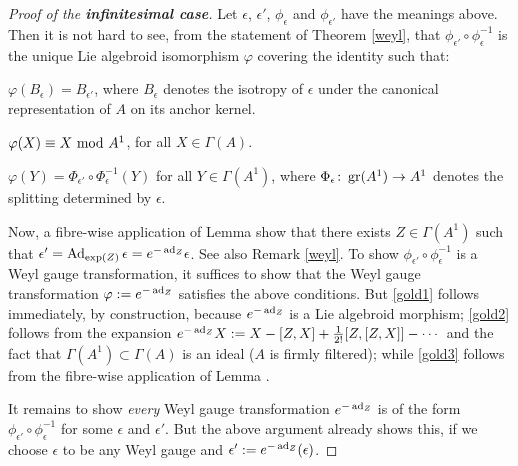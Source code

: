 \documentclass[leqno,12pt]{amsart} %
\begin{document}
\begin{proof}[Proof of the {\bfseries infinitesimal case}]
  Let $\epsilon $, $\epsilon'$, $\phi_\epsilon $ and $\phi_{\epsilon'}$ have the meanings
  above. Then it is not hard to see, from the statement of Theorem \ref{weyl}, that
  $\phi_{\epsilon'}\circ \phi_\epsilon^{-1} $ is the unique Lie algebroid isomorphism
  $\varphi$ covering the identity such that:
  \begin{conditions}
  \item \label{gold1} $\varphi(B_\epsilon) = B_{\epsilon'}$, where $B_\epsilon$ denotes
    the isotropy of $\epsilon $ under the canonical representation of $A$ on its anchor
    kernel.
  \item \label{gold2} $\varphi(X) \equiv X ~\mathrm{mod}~ A^1$, for all $X \in \Gamma(A)$.
  \item \label{gold3} $\varphi(Y) = \Phi_{\epsilon'}\circ \Phi_\epsilon^{-1}(Y)$ for all
    $Y\in \Gamma(A^1)$, where $\Phi_\epsilon \colon \operatorname{\operatorname{gr}}(A^1) \rightarrow A^1$ denotes
    the splitting determined by $\epsilon $.
  \end{conditions}
  Now, a fibre-wise application of Lemma  show that there
  exists $Z \in \Gamma(A^1)$ such that
  $\epsilon' = \operatorname{Ad}_{\exp(Z)}\epsilon = e^{-\operatorname{ad}_Z}\epsilon $. See also Remark
  \ref{weyl}. To show $\phi_{\epsilon'}\circ \phi_\epsilon^{-1}$ is a Weyl gauge
  transformation, it suffices to show that the Weyl gauge transformation
  $\varphi:=e^{-\operatorname{ad}_Z}$ satisfies the above conditions. But \eqref{gold1} follows
  immediately, by construction, because $e^{-\operatorname{ad}_Z}$ is a Lie algebroid morphism;
  \eqref{gold2} follows from the expansion
  $e^{-\operatorname{ad}_Z}X:=X -[Z, X] + \frac{1}{2!}[Z, [Z, X]] - \cdots$ and the fact that
  $\Gamma(A^1) \subset \Gamma(A)$ is an ideal ($A$ is firmly filtered); while
  \eqref{gold3} follows from the fibre-wise application of Lemma
  .

  It remains to show {\em every} Weyl gauge transformation $e^{-\operatorname{ad}_Z}$ is of the
  form $\phi_{\epsilon'}\circ \phi_\epsilon^{-1}$ for some $\epsilon $ and
  $\epsilon'$. But the above argument already shows this, if we choose $\epsilon $ to be
  any Weyl gauge and $\epsilon' := e^{-\operatorname{ad}_Z}(\epsilon)$.
\end{proof}
\end{document}
